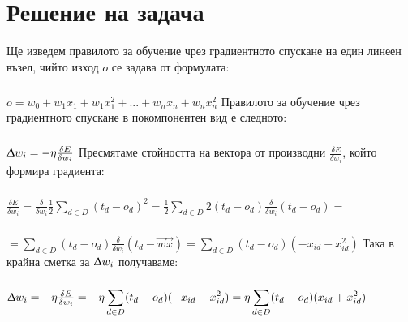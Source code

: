 \documentclass[12pt]{article}
\begin{document}
	
		
	\newpage
	
	\section{Решение на задача }
	
	Ще изведем правилото за обучение чрез градиентното спускане на един линеен възел, чийто изход $o$ се задава от формулата:
	\subparagraph{}
	$o = w_{0} + w_{1}x_{1} + w_{1}x_{1}^2 + ... + w_{n}x_{n} + w_{n}x_{n}^2 $
	\newline\newline\newline
	Правилото за обучение чрез градиентното спускане в покомпонентен вид е следното:
	\subparagraph{}
	$\Updelta w_{i} = - \eta \frac{\delta E}{\delta w_{i}}$
	\newline\newline\newline
	Пресмятаме стойността на вектора от производни $\frac{\delta E}{\delta w_{i}}$, който формира градиента:
	\subparagraph{}
	$\frac{\delta E}{\delta w_{i}} = \frac{\delta}{\delta w_{i}}\frac{1}{2}\displaystyle\sum_{d \in D}(t_{d} - o_{d})^2 = \frac{1}{2} \sum_{d \in D}2(t_{d} - o_{d})\frac{\delta}{\delta w_{i}}(t_{d} - o_{d}) =$  \newline \subparagraph{}$ = \displaystyle \sum_{d \in D}(t_{d} - o_{d})\frac{\delta}{\delta w_{i}}(t_{d} - \vec{w}  \vec{x}) = \sum_{d \in D}(t_{d} - o_{d})(-x_{id} - x_{id}^2)$
	\newline\newline\newline
	Така в крайна сметка за $\Updelta w_{i}$ получаваме:
	\subparagraph{}
	$\Updelta w_{i} = - \eta \frac{\delta E}{\delta w_{i}} = - \eta \displaystyle\sum_{d \in D}(t_{d} - o_{d})(-x_{id} - x_{id}^2) = \eta \displaystyle\sum_{d \in D}(t_{d} - o_{d})(x_{id} + x_{id}^2) $
	


	
\end{document}
